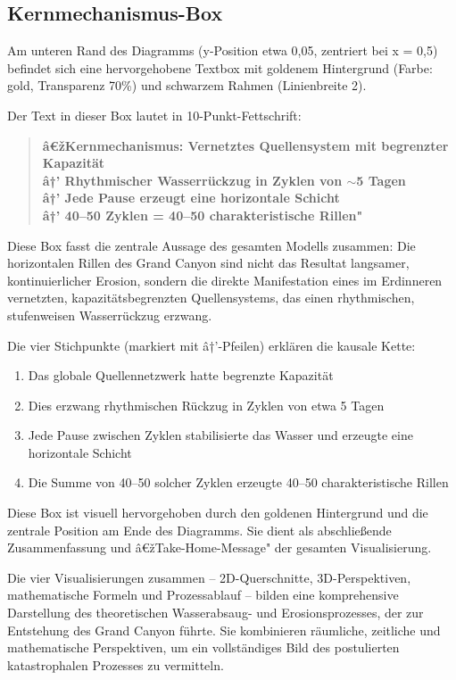 ﻿\documentclass[12pt,a4paper]{report}
\begin{document}
\subsection{Kernmechanismus-Box}

Am unteren Rand des Diagramms (y-Position etwa 0,05, zentriert bei x = 0,5) befindet sich eine hervorgehobene Textbox mit goldenem Hintergrund (Farbe: gold, Transparenz 70\%) und schwarzem Rahmen (Linienbreite 2).

Der Text in dieser Box lautet in 10-Punkt-Fettschrift:
\begin{quote}
	\textbf{â€žKernmechanismus: Vernetztes Quellensystem mit begrenzter Kapazität\\
		â†’ Rhythmischer Wasserrückzug in Zyklen von $\sim$5 Tagen\\
		â†’ Jede Pause erzeugt eine horizontale Schicht\\
		â†’ 40--50 Zyklen = 40--50 charakteristische Rillen"}
\end{quote}

Diese Box fasst die zentrale Aussage des gesamten Modells zusammen: Die horizontalen Rillen des Grand Canyon sind nicht das Resultat langsamer, kontinuierlicher Erosion, sondern die direkte Manifestation eines im Erdinneren vernetzten, kapazitätsbegrenzten Quellensystems, das einen rhythmischen, stufenweisen Wasserrückzug erzwang.

Die vier Stichpunkte (markiert mit â†’-Pfeilen) erklären die kausale Kette:
\begin{enumerate}
	\item Das globale Quellennetzwerk hatte begrenzte Kapazität
	\item Dies erzwang rhythmischen Rückzug in Zyklen von etwa 5 Tagen
	\item Jede Pause zwischen Zyklen stabilisierte das Wasser und erzeugte eine horizontale Schicht
	\item Die Summe von 40--50 solcher Zyklen erzeugte 40--50 charakteristische Rillen
\end{enumerate}

Diese Box ist visuell hervorgehoben durch den goldenen Hintergrund und die zentrale Position am Ende des Diagramms. Sie dient als abschließende Zusammenfassung und â€žTake-Home-Message" der gesamten Visualisierung.

Die vier Visualisierungen zusammen -- 2D-Querschnitte, 3D-Perspektiven, mathematische Formeln und Prozessablauf -- bilden eine komprehensive Darstellung des theoretischen Wasserabsaug- und Erosionsprozesses, der zur Entstehung des Grand Canyon führte. Sie kombinieren räumliche, zeitliche und mathematische Perspektiven, um ein vollständiges Bild des postulierten katastrophalen Prozesses zu vermitteln.
\end{document}
